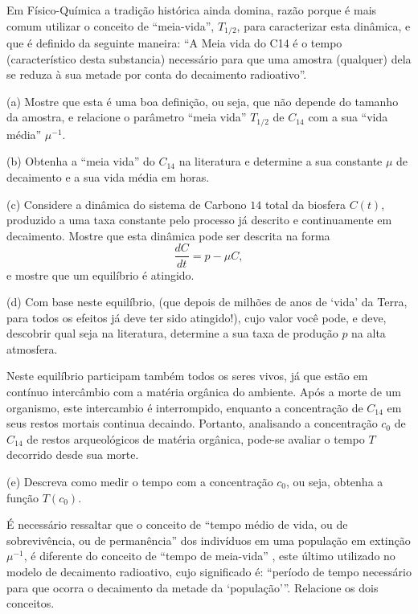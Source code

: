 \begin{exercise}
Em Físico-Química a tradição histórica ainda domina, razão porque é mais comum utilizar o conceito de ``meia-vida'', \(T_{1/2}\), para caracterizar esta dinâmica, e que é definido da seguinte maneira: ``A Meia vida do C14 é o tempo (característico desta substancia) necessário para que uma amostra (qualquer) dela se reduza à sua metade por conta do decaimento radioativo''. 

\begin{description}
\item (a) Mostre que esta é uma boa definição, ou seja, que não depende do tamanho da amostra, e relacione o parâmetro ``meia vida'' \(T_{1/2}\) de \(C_{14}\) com a sua ``vida média'' \(\mu^{-1}\).

\item (b) Obtenha a ``meia vida'' do \(C_{14}\) na literatura e determine a sua constante \(\mu\) de decaimento e a sua vida média em horas.

\item (c) Considere a dinâmica do sistema de Carbono \(14\) total da biosfera \(C(t)\), produzido a uma taxa constante pelo processo já descrito e continuamente em decaimento. Mostre que esta dinâmica pode ser descrita na forma
\[\dfrac{dC}{dt} = p - \mu C,\]
e mostre que um equilíbrio é atingido.

\item (d) Com base neste equilíbrio, (que depois de milhões de anos de `vida' da Terra, para todos os efeitos já deve ter sido atingido!), cujo valor você pode, e deve, descobrir qual seja na literatura, determine a sua taxa de produção \(p\) na alta atmosfera.

Neste equilíbrio participam também todos os seres vivos, já que estão em contínuo intercâmbio com a matéria orgânica do ambiente. Após a morte de um organismo, este intercambio é interrompido, enquanto a concentração de \(C_{14}\) em seus restos mortais continua decaindo. Portanto, analisando a concentração \(c_0\) de \(C_{14}\) de restos arqueológicos de matéria orgânica, pode-se avaliar o tempo \(T\) decorrido desde sua morte. 

\item (e) Descreva como medir o tempo com a concentração \(c_0\), ou seja, obtenha a função \(T(c_0)\).

É necessário ressaltar que o conceito de ``tempo médio de vida, ou de sobrevivência, ou de permanência'' dos indivíduos em uma população em extinção \(\mu^{-1}\), é diferente do conceito de ``tempo de meia-vida'' , este último utilizado no modelo de decaimento radioativo, cujo significado é: ``período de tempo necessário para que ocorra o decaimento da metade da `população'''. Relacione os dois conceitos.
\end{description}
\end{exercise}
 

